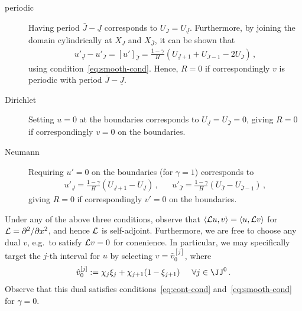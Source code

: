 \documentclass[12pt,a5paper]{article}
\begin{document}
\begin{description}
\item[periodic] Having period $\bar{J}-\underline{J}$ corresponds to \(U_{\bar{J}}=U_{\underline{J}}\). Furthermore, by joining
the domain cylindrically at $X_{\underline{J}}$ and $X_{\bar{J}}$,  it can be shown that
\begin{eqnarray}
u'_{\underline{J}}-u'_{\bar{J}} = [u']_{\bar{J}} = \frac{1-\gamma}{H}(U_{\underline{J}+1}+U_{\bar{J}-1}-2U_{\bar{J}})\,,
\end{eqnarray}
using condition~\eqref{eq:smooth-cond}. Hence, $R=0$ if correspondingly $v$ is periodic with period $\bar{J}-\underline{J}$.
\item[Dirichlet] Setting \(u=0\) at the boundaries corresponds to \(U_{\underline{J}}=U_{\bar{J}}=0\), 
giving $R=0$ if correspondingly \(v=0\) on the boundaries.
\item[Neumann] Requiring \(u'=0\) on the boundaries  (for $\gamma=1$) corresponds to 
\begin{eqnarray}
u'_{\underline{J}}=\frac{1-\gamma}{H}(U_{\underline{J}+1}-U_{\underline{J}})\,,
&&
u'_{\bar{J}}=\frac{1-\gamma}{H}(U_{\bar{J}}-U_{\bar{J}-1})\,,
\end{eqnarray}
giving $R=0$ if correspondingly \(v'=0\) on the boundaries.
\end{description}
Under any of the above three conditions, observe that $\langle{\cal L}u,v\rangle =\langle u,{\cal L}v\rangle$
for ${\cal L}=\DD {x}{}$, and hence ${\cal L}$ is self-adjoint.
Furthermore, we are free to choose any dual $v$, e.g.\ to satisfy ${\cal L}v=0$ for conenience.
In particular, we may specifically target the $j$-th interval for $u$ by selecting $v=\hat{v}_0^{[j]}$, where
\begin{eqnarray}
\hat{v}_0^{[j]} := \chi_j\xi_j + \chi_{j+1}(1-\xi_{j+1})\hspace*{5mm}\forall j\in\JJ^0\,.
\label{eq:vhat0}
\end{eqnarray}
Observe that this dual satisfies conditions~\eqref{eq:cont-cond} and~\eqref{eq:smooth-cond} for $\gamma=0$.
\end{document}

